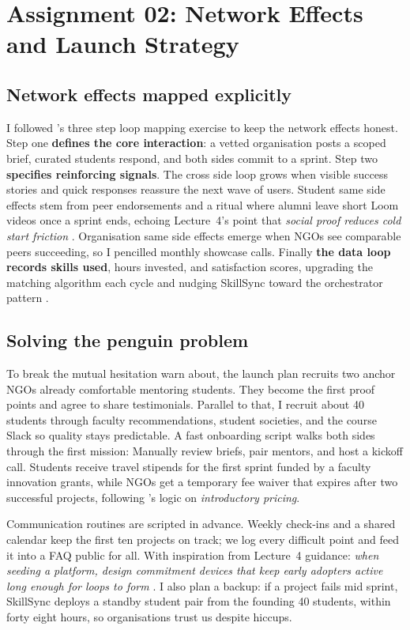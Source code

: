 \section*{Assignment 02: Network Effects and Launch Strategy}

\subsection*{Network effects mapped explicitly}
I followed \citet{Choudary2016}'s three step loop mapping exercise to keep the network effects honest. Step one \textbf{defines the core interaction}: a vetted organisation posts a scoped brief, curated students respond, and both sides commit to a sprint. Step two \textbf{specifies reinforcing signals}. The cross side loop grows when visible success stories and quick responses reassure the next wave of users. Student same side effects stem from peer endorsements and a ritual where alumni leave short Loom videos once a sprint ends, echoing Lecture~4's point that \textit{social proof reduces cold start friction} \citep{Lecture04}. Organisation same side effects emerge when NGOs see comparable peers succeeding, so I pencilled monthly showcase calls. Finally \textbf{the data loop records skills used}, hours invested, and satisfaction scores, upgrading the matching algorithm each cycle and nudging SkillSync toward the orchestrator pattern \citep{Reillier2017}.

\subsection*{Solving the penguin problem}
To break the mutual hesitation \citet{HagiuWright2013} warn about, the launch plan recruits two anchor NGOs already comfortable mentoring students. They become the first proof points and agree to share testimonials. Parallel to that, I recruit about 40 students through faculty recommendations, student societies, and the course Slack so quality stays predictable. A fast onboarding script walks both sides through the first mission: Manually review briefs, pair mentors, and host a kickoff call. Students receive travel stipends for the first sprint funded by a faculty innovation grants, while NGOs get a temporary fee waiver that expires after two successful projects, following \citet{FarrellSaloner1986}'s logic on \textit{introductory pricing}.

Communication routines are scripted in advance. Weekly check-ins and a shared calendar keep the first ten projects on track; we log every difficult point and feed it into a FAQ public for all. With inspiration from Lecture~4 guidance: \textit{when seeding a platform, design commitment devices that keep early adopters active long enough for loops to form} \citep{Lecture04}. I also plan a backup: if a project fails mid sprint, SkillSync deploys a standby student pair from the founding 40 students, within forty eight hours, so organisations trust us despite hiccups.

